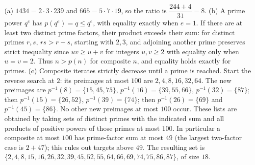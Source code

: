 (a) $1434=2\cdot3\cdot239$ and $665=5\cdot7\cdot19$, so the ratio is $\dfrac{244+4}{31}=\boxed8$. (b) A prime power $q^e$ has $p(q^e)=q\le q^e$, with equality exactly when $e=1$. If there are at least two distinct prime factors, their product exceeds their sum: for distinct primes $r,s$, $rs>r+s$, starting with $2,3$, and adjoining another prime preserves strict inequality since $uv\ge u+v$ for integers $u,v\ge2$ with equality only when $u=v=2$. Thus $n>p(n)$ for composite $n$, and equality holds exactly for primes. (c) Composite iterates strictly decrease until a prime is reached. Start the reverse search at $2$: its preimages at most $100$ are $2,4,8,16,32,64$. The new preimages are $p^{-1}(8)=\{15,45,75\}$, $p^{-1}(16)=\{39,55,66\}$, $p^{-1}(32)=\{87\}$; then $p^{-1}(15)=\{26,52\}$, $p^{-1}(39)=\{74\}$; then $p^{-1}(26)=\{69\}$ and $p^{-1}(45)=\{86\}$. No other new preimages at most $100$ occur. These lists are obtained by taking sets of distinct primes with the indicated sum and all products of positive powers of those primes at most $100$. In particular a composite at most $100$ has prime-factor sum at most $49$ (the largest two-factor case is $2+47$); this rules out targets above $49$. The resulting set is $\{2,4,8,15,16,26,32,39,45,52,55,64,66,69,74,75,86,87\}$, of size $\boxed{18}$.

